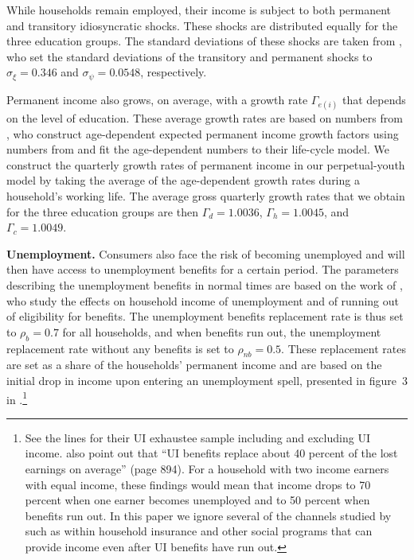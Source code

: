 \documentclass[\econtexRoot/HAFiscal]{subfiles}
\begin{document}
While households remain employed, their income is subject to both permanent and transitory idiosyncratic shocks.
These shocks are distributed equally for the three education groups.
The standard deviations of these shocks are taken from \cite{carroll2020sticky}, who set the standard deviations of the transitory and permanent shocks to $\sigma_\xi=0.346$ and $\sigma_\psi=0.0548$, respectively.


Permanent income also grows, on average, with a growth rate $\Gamma_{e(i)}$ that depends on the level of education.
These average growth rates are based on numbers from \cite{carroll2020modeling}, who construct age-dependent expected permanent income growth factors using numbers from \cite{cagetti2003wealth} and fit the age-dependent numbers to their life-cycle model.
We construct the quarterly growth rates of permanent income in our perpetual-youth model by taking the average of the age-dependent growth rates during a household's working life.
The average gross quarterly growth rates that we obtain for the three education groups are then $\Gamma_d=1.0036$, $\Gamma_h=1.0045$, and $\Gamma_c=1.0049$.

\textbf{Unemployment.} Consumers also face the risk of becoming unemployed and will then have access to unemployment benefits for a certain period.
The parameters describing the unemployment benefits in normal times are based on the work of \cite{rothstein2017scraping}, who study the effects on household income of unemployment and of running out of eligibility for benefits.
The unemployment benefits replacement rate is thus set to $\rho_b=0.7$ for all households, and when benefits run out, the unemployment replacement rate without any benefits is set to $\rho_{nb}=0.5$.
These replacement rates are set as a share of the households' permanent income and are based on the initial drop in income upon entering an unemployment spell, presented in figure~3 in \cite{rothstein2017scraping}.\footnote{See the lines for their UI exhaustee sample including and excluding UI income.
\cite{rothstein2017scraping} also point out that ``UI benefits replace about 40 percent of the lost earnings on average'' (page 894).
For a household with two income earners with equal income, these findings would mean that income drops to 70 percent when one earner becomes unemployed and to 50 percent when benefits run out.
In this paper we ignore several of the channels studied by \cite{rothstein2017scraping} such as within household insurance and other social programs that can provide income even after UI benefits have run out.} 
\end{document}
